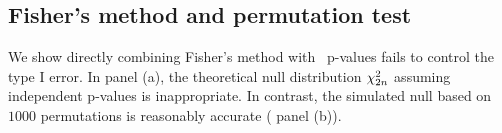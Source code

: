 




\subsection{Fisher's method and permutation test}\label{sec:example.fisher}

We show directly combining Fisher's method with \nickname~p-values fails to control the type I error.
In  panel (a), the theoretical null distribution $\chi_{2 {n}}^2$ assuming independent p-values is inappropriate.
In contrast, the simulated null based on $1000$ permutations is
reasonably accurate ( panel (b)).


